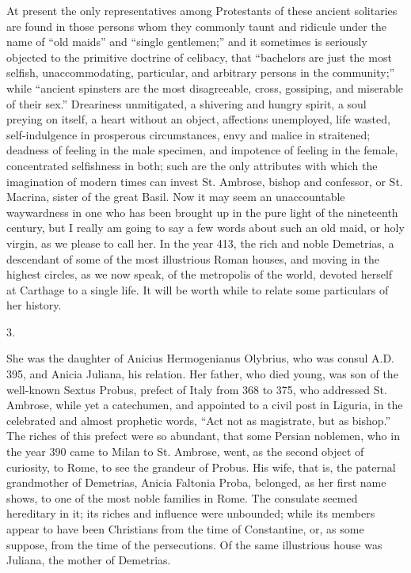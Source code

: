 At present the only representatives among Protestants of these
ancient solitaries are found in those persons whom they commonly taunt
and ridicule under the name of ``old maids'' and ``single
gentlemen;'' and it sometimes is seriously objected to the
primitive doctrine of celibacy, that ``bachelors are just the most
selfish, unaccommodating, particular, and arbitrary persons in the
community;'' while ``ancient spinsters are the most
disagreeable, cross, gossiping, and miserable of their sex.''
Dreariness unmitigated, a shivering and hungry spirit, a soul preying
on itself, a heart without an object, affections unemployed, life
wasted, self-indulgence in prosperous circumstances, envy and malice
in straitened; deadness of feeling in the male specimen, and impotence
of feeling in the female, concentrated selfishness in both; such are
the only attributes with which the imagination of modern times can
invest St. Ambrose, bishop and confessor, or St. Macrina, sister of
the great Basil. Now it may seem an unaccountable waywardness in one
who has been brought up in the pure light of the nineteenth century, but I really am going to say a few words about such an old
maid, or holy virgin, as we please to call her. In the year 413, the
rich and noble Demetrias, a descendant of some of the most illustrious
Roman houses, and moving in the highest circles, as we now speak, of
the metropolis of the world, devoted herself at Carthage to a single
life. It will be worth while to relate some particulars of her
history.

3.

She was the daughter of Anicius Hermogenianus Olybrius, who was
consul A.D. 395, and Anicia Juliana, his
relation. Her father, who died young, was son of the well-known Sextus
Probus, prefect of Italy from 368 to 375, who addressed St. Ambrose,
while yet a catechumen, and appointed to a civil post in Liguria, in
the celebrated and almost prophetic words, ``Act not as
magistrate, but as bishop.'' The riches of this prefect were so
abundant, that some Persian noblemen, who in the year 390 came to
Milan to St. Ambrose, went, as the second object of curiosity, to
Rome, to see the grandeur of Probus. His wife, that is, the paternal
grandmother of Demetrias, Anicia Faltonia Proba, belonged, as her
first name shows, to one of the most noble families in Rome. The
consulate seemed hereditary in it; its riches and influence were
unbounded; while its members appear to have been Christians from the
time of Constantine, or, as some suppose, from the time of the
persecutions. Of the same illustrious house was Juliana, the mother of
Demetrias.

